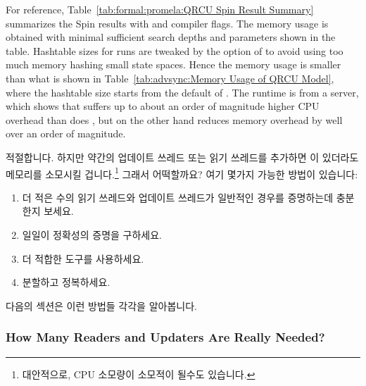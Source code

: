 For reference, Table~\ref{tab:formal:promela:QRCU Spin Result Summary}
summarizes the Spin results with  and 
compiler flags.
The memory usage is obtained with minimal sufficient
search depths and  parameters shown in the table.
Hashtable sizes for  runs are tweaked by
the  option of  to avoid using too much
memory hashing small state spaces.
Hence the memory usage is smaller than what is shown in
Table~\ref{tab:advsync:Memory Usage of QRCU Model}, where the
hashtable size starts from the default of .
The runtime is from a  server, which shows that 
suffers up to about an order of magnitude higher CPU overhead
than does , but on the other hand reduces memory overhead
by well over an order of magnitude.
\fi

적절합니다.
하지만 약간의 업데이트 쓰레드 또는 읽기 쓰레드를 추가하면  이
있더라도 메모리를 소모시킬 겁니다.\footnote{
	대안적으로, CPU 소모량이 소모적이 될수도 있습니다.}
그래서 어떡할까요?
여기 몇가지 가능한 방법이 있습니다:
\iffalse

So far so good.
But adding a few more updaters or readers would exhaust memory, even
with \co{-DMA=N}.\footnote{
	Alternatively, the CPU consumption would become excessive.}
So what to do?
Here are some possible approaches:
\fi

\begin{enumerate}
\item	더 적은 수의 읽기 쓰레드와 업데이트 쓰레드가 일반적인 경우를 증명하는데
	충분한지 보세요.
\item	일일이 정확성의 증명을 구하세요.
\item	더 적합한 도구를 사용하세요.
\item	분할하고 정복하세요.
\iffalse

\item	See whether a smaller number of readers and updaters suffice
	to prove the general case.
\item	Manually construct a proof of correctness.
\item	Use a more capable tool.
\item	Divide and conquer.
\fi
\end{enumerate}

다음의 섹션은 이런 방법들 각각을 알아봅니다.
\iffalse

The following sections discuss each of these approaches.
\fi

\subsubsection{How Many Readers and Updaters Are Really Needed?}
\label{sec:formal:How Many Readers and Updaters Are Really Needed?}

